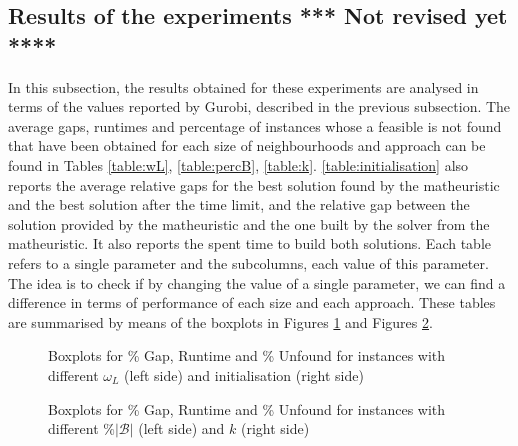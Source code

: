 \documentclass[a4paper,  review, authoryear, 1p.]{elsarticle}
\newcommand{\JP}[1]{{\color{armygreen}#1}}
\newcommand{\CV}[1]{{\color{blue}#1}}
\begin{document}
		\subsection{Results of the experiments \JP{*** Not revised yet ****}}
		\CV{In this subsection, the results obtained for these experiments are analysed in terms of the values reported by Gurobi, described in the previous subsection. 
		The average gaps, runtimes and percentage of instances whose a feasible is not found that have been obtained for each size of neighbourhoods and approach can be found in Tables \ref{table:wL}, \ref{table:percB}, \ref{table:k}. \ref{table:initialisation} also reports the average relative gaps for the best solution found by the matheuristic and the best solution after the time limit, and the relative gap between the solution provided by the matheuristic and the one built by the solver from the matheuristic. It also reports the spent time to build both solutions. Each table refers to a single parameter and the subcolumns, each value of this parameter. The idea is to check if by changing the value of a single parameter, we can find a difference in terms of performance of each size and each approach. These tables are summarised by means of  the boxplots in Figures \ref{fig:results_wL} and Figures \ref{fig:results_percentage}.

		
		
		
		

		\begin{figure}[h!]
			\centering
			\caption{Boxplots for \% Gap, Runtime and \% Unfound for instances with different $\omega_L$ (left side) and initialisation (right side)}
			
			\label{fig:results_wL}
			
		\end{figure}

		\begin{figure}[h!]
			\centering
			\caption{Boxplots for \% Gap, Runtime and \% Unfound for instances with different $\%|\mathcal B|$ (left side) and $k$ (right side)}

			
			\label{fig:results_percentage}
					
		\end{figure}

}
\end{document}
